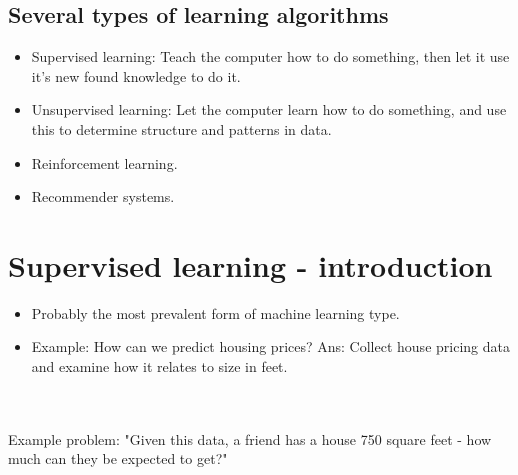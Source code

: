 \documentclass{article}
\begin{document}
\subsection*{Several types of learning algorithms}
\begin{itemize}
  \item Supervised learning: Teach the computer how to do something, then let it use it's new found knowledge to do it.
  \item Unsupervised learning: Let the computer learn how to do something, and use this to determine structure and patterns in data.
  \item Reinforcement learning.
  \item Recommender systems.
\end{itemize}

\section*{Supervised learning - introduction}
\begin{itemize}
  \item Probably the most prevalent form of machine learning type.
  \item Example: How can we predict housing prices? Ans: Collect house pricing data and examine how it relates to size in feet.
\end{itemize}

\\\\
Example problem: "Given this data, a friend has a house 750 square feet - how much can they be expected to get?"
\end{document}
